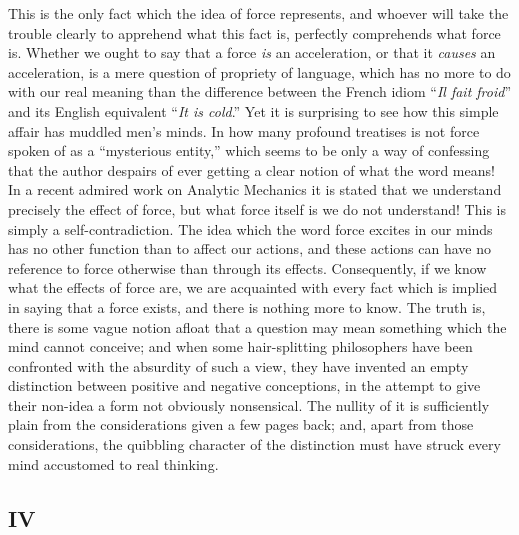 \documentclass[]{article}
\begin{document}
This is the only fact which the idea of force represents, and whoever will take the trouble clearly to apprehend what this fact is, perfectly comprehends what force is. Whether we ought to say that a force \emph{is} an acceleration, or that it \emph{causes} an acceleration, is a mere question of propriety of language, which has no more to do with our real meaning than the difference between the French idiom ``\emph{Il fait froid}'' and its English equivalent ``\emph{It is cold}.'' Yet it is surprising to see how this simple affair has muddled men's minds. In how many profound treatises is not force spoken of as a ``mysterious entity,'' which seems to be only a way of confessing that the author despairs of ever getting a clear notion of what the word means! In a recent admired work on Analytic Mechanics it is stated that we understand precisely the effect of force, but what force itself is we do not understand! This is simply a self-contradiction. The idea which the word force excites in our minds has no other function than to affect our actions, and these actions can have no reference to force otherwise than through its effects. Consequently, if we know what the effects of force are, we are acquainted with every fact which is implied in saying that a force exists, and there is nothing more to know. The truth is, there is some vague notion afloat that a question may  mean something which the mind cannot conceive; and when some hair-splitting philosophers have been confronted with the absurdity of such a view, they have invented an empty distinction between positive and negative conceptions, in the attempt to give their non-idea a form not obviously nonsensical. The nullity of it is sufficiently plain from the considerations given a few pages back; and, apart from those considerations, the quibbling character of the distinction must have struck every mind accustomed to real thinking.

\subsection*{IV}
\end{document}
